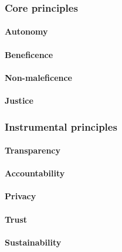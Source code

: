 \subsubsection{Core principles}

\paragraph{Autonomy}

\paragraph{Beneficence}

\paragraph{Non-maleficence}

\paragraph{Justice}


\subsubsection{Instrumental principles}

\paragraph{Transparency}

\paragraph{Accountability}

\paragraph{Privacy}

\paragraph{Trust}

\paragraph{Sustainability}

